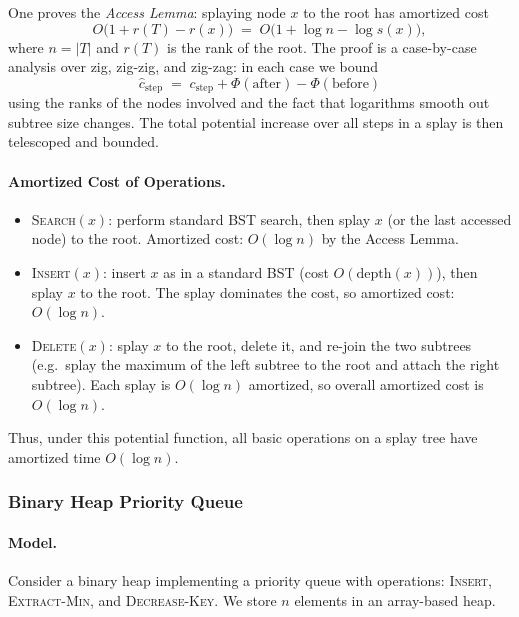 \documentclass[9pt]{extarticle}
\begin{document}
One proves the \emph{Access Lemma}: splaying node $x$ to the root has amortized cost
\[
  O\bigl( 1 + r(T) - r(x) \bigr)
  \;=\; O\bigl( 1 + \log n - \log s(x) \bigr),
\]
where $n = |T|$ and $r(T)$ is the rank of the root.
The proof is a case-by-case analysis over zig, zig-zig, and zig-zag:
in each case we bound
\[
  \hat c_{\text{step}}
  \;=\; c_{\text{step}} + \Phi(\text{after}) - \Phi(\text{before})
\]
using the ranks of the nodes involved and the fact that logarithms smooth out subtree size changes.
The total potential increase over all steps in a splay is then telescoped and bounded.

\paragraph{Amortized Cost of Operations.}
\begin{itemize}
  \item \textsc{Search}$(x)$: perform standard BST search, then splay $x$ (or the last accessed node) to the root.  
  Amortized cost: $O(\log n)$ by the Access Lemma.

  \item \textsc{Insert}$(x)$: insert $x$ as in a standard BST (cost $O(\text{depth}(x))$),
  then splay $x$ to the root.
  The splay dominates the cost, so amortized cost: $O(\log n)$.

  \item \textsc{Delete}$(x)$: splay $x$ to the root, delete it, and re-join the two subtrees
  (e.g.\ splay the maximum of the left subtree to the root and attach the right subtree).
  Each splay is $O(\log n)$ amortized, so overall amortized cost is $O(\log n)$.
\end{itemize}

Thus, under this potential function, all basic operations on a splay tree have amortized time $O(\log n)$.

\subsubsection{Binary Heap Priority Queue}

\paragraph{Model.}
Consider a binary heap implementing a priority queue with operations:
\textsc{Insert}, \textsc{Extract-Min}, and \textsc{Decrease-Key}.
We store $n$ elements in an array-based heap.
\end{document}
